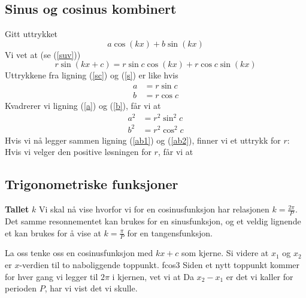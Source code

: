 \subsection*{Sinus og cosinus kombinert}
Gitt uttrykket
\begin{equation}
a \cos (kx) + b \sin (kx) \label{sc}
\end{equation}
Vi vet at (se (\ref{suv}))
\begin{equation}
r \sin(kx+c)= r\sin c\cos (kx) + r\cos c \sin (kx)  \label{s}
\end{equation}
Uttrykkene fra ligning (\ref{sc}) og (\ref{s}) er like hvis
\begin{align}
a &= r\sin c \label{a} \\
b &= r\cos c \label{b}
\end{align}
Kvadrerer vi ligning (\ref{a}) og (\ref{b}), får vi at
\begin{align}
a^2 &= r^2\sin^2 c \label{ab1}\\
b^2 &= r^2\cos^2 c \label{ab2}
\end{align}
Hvis vi nå legger sammen ligning (\ref{ab1}) og (\ref{ab2}), finner vi et uttrykk for $r$:
Hvis vi velger den positive løsningen for $ r $, får vi at
\newpage
\subsection*{Trigonometriske funksjoner}
\textbf{Tallet} {\boldmath $ k $} \bs
Vi skal nå vise hvorfor vi for en cosinusfunksjon har relasjonen $ {k=\frac{2\pi}{P}} $. Det samme resonnementet kan brukes for en sinusfunksjon, og et veldig lignende et kan brukes for å vise at $ {k=\frac{\pi}{P}} $ for en tangensfunksjon.\vsk

La oss tenke oss en cosinusfunksjon med $ kx+c $ som kjerne. Si videre at $ x_1 $ og $ x_2 $ er $ x $-verdien til to naboliggende toppunkt. 
{fcos3} 
Siden et nytt toppunkt kommer for hver gang vi legger til $ 2\pi $ i kjernen, vet vi at
Da $ x_2-x_1 $ er det vi kaller for perioden $ P $, har vi vist det vi skulle.



